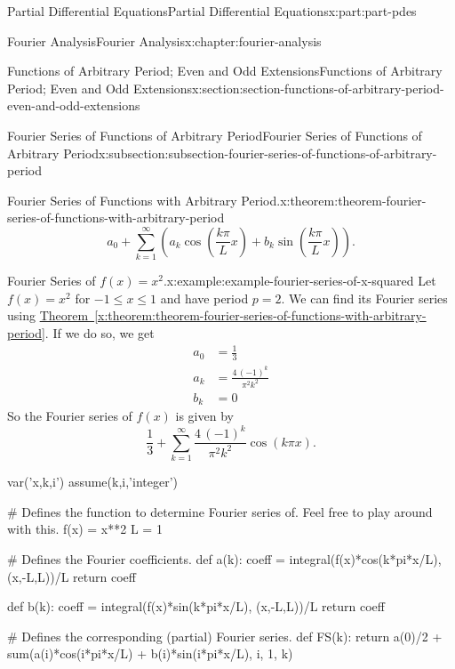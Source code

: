 \documentclass[twoside,10pt,]{book}
\newcommand{\xreffont}{\relax}
\numberwithin{equation}{part}
\newcommand{\amp}{&}
\begin{document}
\begin{partptx}{Partial Differential Equations}{}{Partial Differential Equations}{}{}{x:part:part-pdes}
\begin{chapterptx}{Fourier Analysis}{}{Fourier Analysis}{}{}{x:chapter:fourier-analysis}
\begin{sectionptx}{Functions of Arbitrary Period; Even and Odd Extensions}{}{Functions of Arbitrary Period; Even and Odd Extensions}{}{}{x:section:section-functions-of-arbitrary-period-even-and-odd-extensions}
\begin{subsectionptx}{Fourier Series of Functions of Arbitrary Period}{}{Fourier Series of Functions of Arbitrary Period}{}{}{x:subsection:subsection-fourier-series-of-functions-of-arbitrary-period}
\begin{theorem}{Fourier Series of Functions with Arbitrary Period.}{}{x:theorem:theorem-fourier-series-of-functions-with-arbitrary-period}
\begin{equation*}
a_{0}+\sum_{k=1}^{\infty}\left(a_{k}\cos\left(\frac{k\pi}{L}x\right)+b_{k}\sin\left(\frac{k\pi}{L}x\right)\right).
\end{equation*}
%
\end{theorem}
\begin{example}{Fourier Series of \(f(x) = x^{2}\).}{x:example:example-fourier-series-of-x-squared}%
Let \(f(x) = x^{2}\) for \(-1\leq x\leq 1\) and have period \(p=2\). We can find its Fourier series using \hyperref[x:theorem:theorem-fourier-series-of-functions-with-arbitrary-period]{Theorem~{\xreffont\ref{x:theorem:theorem-fourier-series-of-functions-with-arbitrary-period}}}. If we do so, we get%
\begin{align*}
a_{0} \amp= \frac{1}{3}\\
a_{k} \amp= \frac{4 \, \left(-1\right)^{k}}{\pi^{2} k^{2}}\\
b_{k} \amp= 0
\end{align*}
So the Fourier series of \(f(x)\) is given by%
\begin{equation*}
\frac{1}{3} + \sum_{k=1}^{\infty}\frac{4 \, \left(-1\right)^{k}}{\pi^{2} k^{2}}\cos\left(k\pi x\right)\text{.}
\end{equation*}
%
\end{example}
\begin{sageinput}
var('x,k,i')
assume(k,i,'integer')

# Defines the function to determine Fourier series of. Feel free to play around with this.
f(x) = x**2
L = 1

# Defines the Fourier coefficients.
def a(k):
  coeff = integral(f(x)*cos(k*pi*x/L), (x,-L,L))/L
  return coeff

def b(k):
  coeff = integral(f(x)*sin(k*pi*x/L), (x,-L,L))/L
  return coeff

# Defines the corresponding (partial) Fourier series.
def FS(k):
  return a(0)/2 + sum(a(i)*cos(i*pi*x/L) + b(i)*sin(i*pi*x/L), i, 1, k)


\end{sageinput}
\end{subsectionptx}
\end{sectionptx}
\end{chapterptx}
\end{partptx}
\end{document}
